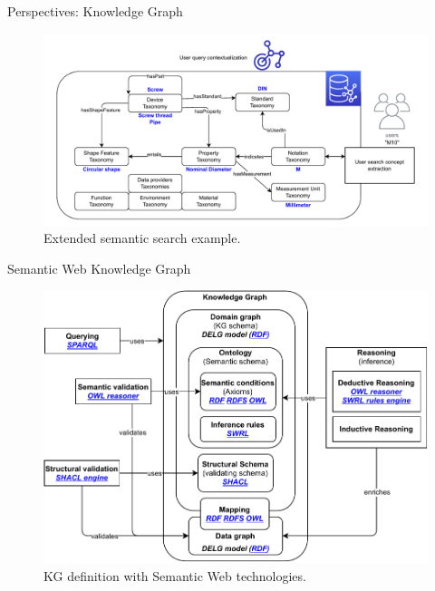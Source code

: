 \begin{frame}{Perspectives: Knowledge Graph}

    \begin{figure} [H]
        \begin{center}
            \includegraphics[scale=0.5]{images/semantic_search_example.pdf} 
            \caption{Extended semantic search example.} 
        \end{center}
    \end{figure}

\end{frame}

\begin{frame}{Semantic Web Knowledge Graph}
    
    \begin{figure} [H]
        \begin{center}
            \includegraphics[scale=0.6]{images/kg-def-technos.pdf} 
            \caption{KG definition with Semantic Web technologies.} 
        \end{center}
    \end{figure}

\end{frame}

